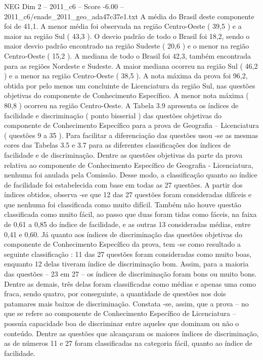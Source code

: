 \begin{textsample}{NEG Dim 2 – 2011\_c6 – Score -6.00 – 2011\_c6/enade\_2011\_geo\_ada47c37e1.txt}
A média do Brasil deste componente foi de 41,1.
A menor média foi observada na região Centro-Oeste ( 39,5 ) e a maior na região Sul ( 43,3 ).
O desvio padrão de todo o Brasil foi 18,2, sendo o maior desvio padrão encontrado na região Sudeste ( 20,6 ) e o menor na região Centro-Oeste ( 15,2 ).
A mediana de todo o Brasil foi 42,3, também encontrada para as regiões Nordeste e Sudeste.
A maior mediana ocorreu na região Sul ( 46,2 ) e a menor na região Centro-Oeste ( 38,5 ).
A nota máxima da prova foi 96,2, obtida por pelo menos um concluinte de Licenciatura da região Sul, nas questões objetivas do componente de Conhecimento Específico.
A menor nota máxima ( 80,8 ) ocorreu na região Centro-Oeste.
A Tabela 3.9 apresenta os índices de facilidade e discriminação ( ponto bisserial ) das questões objetivas do componente de Conhecimento Específico para a prova de Geografia – Licenciatura ( questões 9 a 35 ).
Para facilitar a diferenciação das questões usou -se as mesmas cores das Tabelas 3.5 e 3.7 para as diferentes classificações dos índices de facilidade e de discriminação.
Dentre as questões objetivas da parte da prova relativa ao componente de Conhecimento Específico de Geografia - Licenciatura, nenhuma foi anulada pela Comissão.
Desse modo, a classificação quanto ao índice de facilidade foi estabelecida com base em todas as 27 questões.
A partir dos índices obtidos, observa -se que 12 das 27 questões foram consideradas difíceis e que nenhuma foi classificada como muito difícil.
Também não houve questão classificada como muito fácil, ao passo que duas foram tidas como fáceis, na faixa de 0,61 a 0,85 do índice de facilidade, e as outras 13 consideradas médias, entre 0,41 e 0,60.
Já quanto aos índices de discriminação das questões objetivas do componente de Conhecimento Específico da prova, tem -se como resultado a seguinte classificação : 11 das 27 questões foram consideradas como muito boas, enquanto 12 delas tiveram índice de discriminação bom.
Assim, para a maioria das questões – 23 em 27 – os índices de discriminação foram bons ou muito bons.
Dentre as demais, três delas foram classificadas como médias e apenas uma como fraca, sendo quatro, por conseguinte, a quantidade de questões nos dois patamares mais baixos de discriminação.
Constata -se, assim, que a prova – no que se refere ao componente de Conhecimento Específico de Licenciatura – possuía capacidade boa de discriminar entre aqueles que dominam ou não o conteúdo.
Dentre as questões que alcançaram os maiores índices de discriminação, as de números 11 e 27 foram classificadas na categoria fácil, quanto ao índice de facilidade.

\end{textsample}
